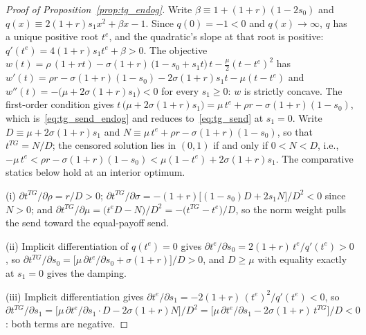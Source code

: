 \documentclass[11pt]{article}
\theoremstyle{plain}
\theoremstyle{remark}
\begin{document}
\begin{proof}[Proof of Proposition~\ref{prop:tg_endog}]
Write $\beta\equiv1+(1+r)(1-2s_{0})$ and $q(x)\equiv2(1+r)s_{1}x^{2}+\beta x-1$. Since $q(0)=-1<0$ and $q(x)\to\infty$, $q$ has a unique positive root $t^{e}$, and the quadratic's slope at that root is positive: $q'(t^{e})=4(1+r)s_{1}t^{e}+\beta>0$. The objective $w(t)=\rho\,(1+rt)-\sigma(1+r)\,\bigl(1-s_{0}+s_{1}t\bigr)\,t-\frac{\mu}{2}\left(t-t^{e}\right)^{2}$ has $w'(t)=\rho r-\sigma(1+r)(1-s_{0})-2\sigma(1+r)s_{1}t-\mu\left(t-t^{e}\right)$ and $w''(t)=-\bigl(\mu+2\sigma(1+r)s_{1}\bigr)<0$ for every $s_{1}\ge0$: $w$ is strictly concave. The first-order condition gives $t\,\bigl(\mu+2\sigma(1+r)s_{1}\bigr)=\mu\,t^{e}+\rho r-\sigma(1+r)(1-s_{0})$, which is~\eqref{eq:tg_send_endog} and reduces to~\eqref{eq:tg_send} at $s_{1}=0$. Write $D\equiv\mu+2\sigma(1+r)s_{1}$ and $N\equiv\mu\,t^{e}+\rho r-\sigma(1+r)(1-s_{0})$, so that $t^{TG}=N/D$; the censored solution lies in $(0,1)$ if and only if $0<N<D$, i.e., $-\mu\,t^{e}<\rho r-\sigma(1+r)(1-s_{0})<\mu(1-t^{e})+2\sigma(1+r)s_{1}$. The comparative statics below hold at an interior optimum.

(i) $\partial t^{TG}/\partial\rho=r/D>0$; $\partial t^{TG}/\partial\sigma=-(1+r)\bigl[(1-s_{0})D+2s_{1}N\bigr]/D^{2}<0$ since $N>0$; and $\partial t^{TG}/\partial\mu=\bigl(t^{e}D-N\bigr)/D^{2}=-\bigl(t^{TG}-t^{e}\bigr)/D$, so the norm weight pulls the send toward the equal-payoff send.

(ii) Implicit differentiation of $q(t^{e})=0$ gives $\partial t^{e}/\partial s_{0}=2(1+r)\,t^{e}/q'(t^{e})>0$, so $\partial t^{TG}/\partial s_{0}=\bigl[\mu\,\partial t^{e}/\partial s_{0}+\sigma(1+r)\bigr]/D>0$, and $D\ge\mu$ with equality exactly at $s_{1}=0$ gives the damping.

(iii) Implicit differentiation gives $\partial t^{e}/\partial s_{1}=-2(1+r)\,(t^{e})^{2}/q'(t^{e})<0$, so $\partial t^{TG}/\partial s_{1}=\bigl[\mu\,\partial t^{e}/\partial s_{1}\cdot D-2\sigma(1+r)N\bigr]/D^{2}=\bigl[\mu\,\partial t^{e}/\partial s_{1}-2\sigma(1+r)\,t^{TG}\bigr]/D<0$: both terms are negative.
\end{proof}
\end{document}
